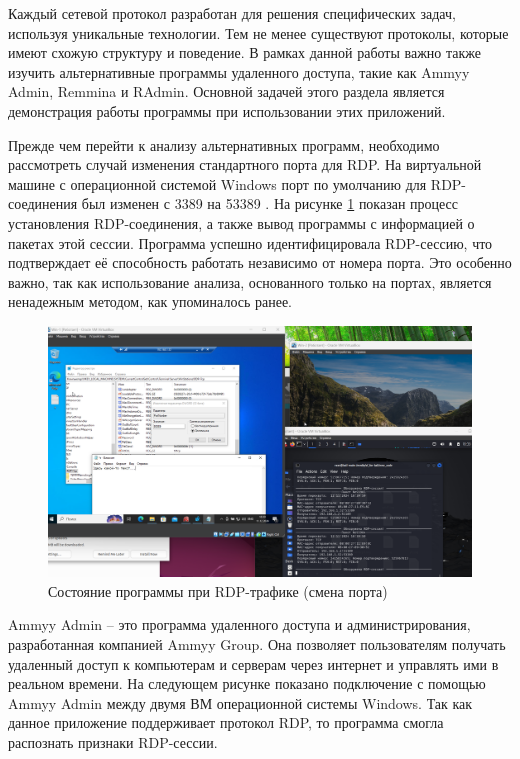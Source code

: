 \documentclass[spec, och, diploma]{SCWorks}
\begin{document}
Каждый сетевой протокол разработан для решения специфических задач, используя уникальные технологии. Тем не 
менее существуют протоколы, которые имеют схожую структуру и поведение. В рамках данной работы важно также 
изучить альтернативные программы удаленного доступа, такие как Ammyy Admin, Remmina и RAdmin. Основной задачей 
этого раздела является демонстрация работы программы при использовании этих приложений.

Прежде чем перейти к анализу альтернативных программ, необходимо рассмотреть случай изменения стандартного порта для RDP. На виртуальной машине с 
операционной системой Windows порт по умолчанию для RDP-соединения был изменен с 3389 на 53389 \cite{rdpport}. На рисунке \ref{rdp2} показан процесс 
установления RDP-соединения, а также вывод программы с информацией о пакетах этой сессии. Программа успешно идентифицировала RDP-сессию, 
что подтверждает её способность работать независимо от номера порта. Это особенно важно, так как использование анализа, основанного только 
на портах, является ненадежным методом, как упоминалось ранее.

\begin{figure}[H]
  \centering
  \includegraphics[width=1.0\textwidth]{pics/8rdp.png}
  \caption{Состояние программы при RDP-трафике (смена порта)}
  \label{rdp2}
\end{figure}

Ammyy Admin -- это программа удаленного доступа и администрирования, разработанная компанией Ammyy Group. Она 
позволяет пользователям получать удаленный доступ к компьютерам и серверам через интернет и управлять ими 
в реальном времени. На следующем рисунке показано подключение с помощью Ammyy Admin между двумя ВМ операционной системы Windows. 
Так как данное приложение поддерживает протокол RDP, то программа смогла распознать признаки RDP-сессии.
\end{document}
